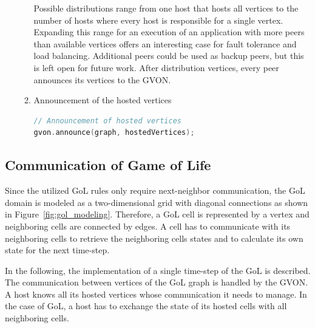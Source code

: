 \begin{enumerate}
\begin{enumerate}
  \noindent Possible distributions range from one host that hosts all
  vertices to the number of hosts where every host is responsible for
  a single vertex. Expanding this range for an execution of an
  application with more peers than available vertices offers an
  interesting case for fault tolerance and load balancing.  Additional
  peers could be used as backup peers, but this is left open for
  future work.  After distribution vertices, every peer announces its
  vertices to the GVON.

\item Announcement of the hosted vertices

  \begin{minipage}[t]{\textwidth} 
  \begin{lstlisting}[language=C++, label=lst:gol_announce, caption={}]
// Announcement of hosted vertices
gvon.announce(graph, hostedVertices);
  \end{lstlisting}
  \end{minipage}
  
  \end{enumerate}
\end{enumerate}

\subsection{Communication of Game of Life}
\label{sec:gol_imp}
Since the utilized GoL rules only require next-neighbor communication,
the GoL domain is modeled as a two-dimensional grid with diagonal
connections as shown in Figure~\ref{fig:gol_modeling}. Therefore, a
GoL cell is represented by a vertex and neighboring cells are
connected by edges. A cell has to communicate with its neighboring
cells to retrieve the neighboring cells states and to calculate its own
state for the next time-step.

In the following, the implementation of a single time-step of the GoL
is described. The communication between vertices of the GoL graph is
handled by the GVON. A host knows all its hosted vertices whose
communication it needs to manage. In the case of GoL, a host has to
exchange the state of its hosted cells with all neighboring cells.

